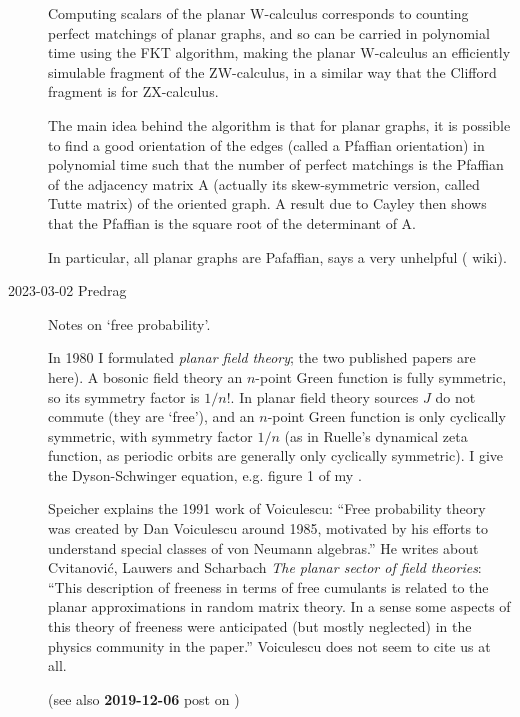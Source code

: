 \begin{description}
Computing scalars of the planar W-calculus corresponds to counting perfect
matchings of planar graphs, and so can be carried in polynomial time using
the FKT algorithm, making the planar W-calculus an efficiently simulable
fragment of the ZW-calculus, in a similar way that the Clifford fragment is
for ZX-calculus.

The main idea behind the algorithm is that for planar graphs, it is possible
to find a good orientation of the edges (called a Pfaffian orientation) in
polynomial time such that the number of perfect matchings is the Pfaffian of
the adjacency matrix A (actually its skew-symmetric version, called Tutte
matrix) of the oriented graph. A result due to Cayley then shows that the
Pfaffian is the square root of the determinant of A.

In particular, all planar graphs are Pafaffian, says a very unhelpful
( {wiki}).

   \item[2023-03-02 Predrag]
Notes on `free probability'.

In 1980 I formulated {\em planar field theory};
the two published papers are
 {here}).
A bosonic field theory an $n$-point Green function is fully symmetric, so its
symmetry factor is $1/n!$.
In planar field theory sources $J$ do not commute (they are `free'), and an
$n$-point Green function is only cyclically symmetric, with symmetry factor
$1/n$ (as in Ruelle's dynamical zeta function, as periodic orbits
are generally only cyclically symmetric). I give the Dyson-Schwinger
equation, e.g. figure 1 of my
.

Speicher explains the 1991  work of Voiculescu: ``Free probability theory was
created by Dan Voiculescu around 1985, motivated by his efforts to
understand special classes of von Neumann algebras.'' He writes about
Cvitanovi{\'c}, Lauwers and Scharbach {\em The planar sector of
field theories}: ``This description of freeness in terms of free
cumulants is related to the planar approximations in random matrix theory.
In a sense some aspects of this theory of freeness were anticipated (but
mostly neglected) in the physics community in the  paper.''
Voiculescu does not seem to cite us at all.

(see also {\bf 2019-12-06} post on )


\end{description}
